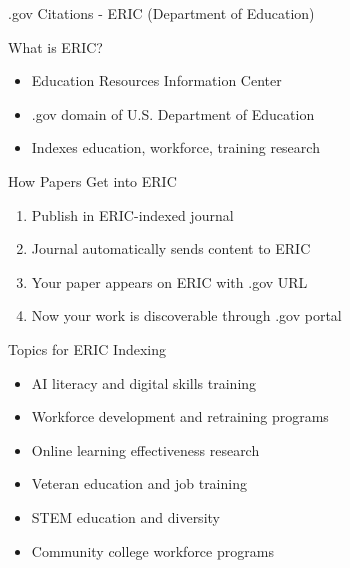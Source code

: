 \documentclass[11pt]{beamer}
\begin{document}
	\begin{frame}{.gov Citations - ERIC (Department of Education)}
		\scriptsize
		\begin{block}{What is ERIC?}
			\begin{itemize}
				\item Education Resources Information Center
				\item .gov domain of U.S. Department of Education
				\item Indexes education, workforce, training research
			\end{itemize}
		\end{block}
		\begin{block}{How Papers Get into ERIC}
			\begin{enumerate}
				\item Publish in ERIC-indexed journal
				\item Journal automatically sends content to ERIC
				\item Your paper appears on ERIC with .gov URL
				\item Now your work is discoverable through .gov portal
			\end{enumerate}
		\end{block}
		\begin{block}{Topics for ERIC Indexing}
			\begin{itemize}
				\item AI literacy and digital skills training
				\item Workforce development and retraining programs
				\item Online learning effectiveness research
				\item Veteran education and job training
				\item STEM education and diversity
				\item Community college workforce programs
			\end{itemize}
		\end{block}
	\end{frame}
	
\end{document}

